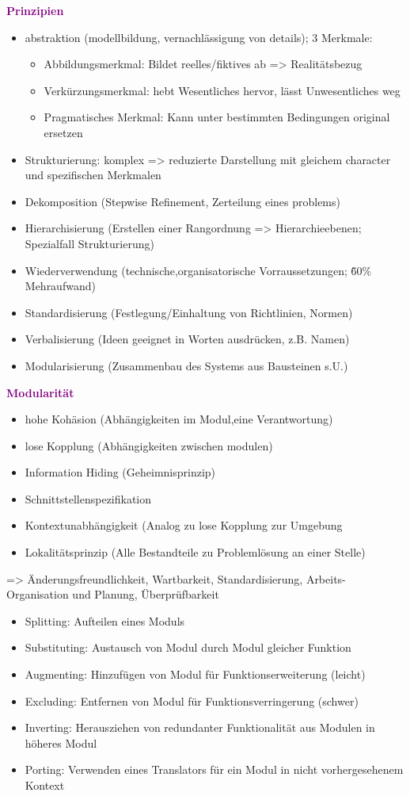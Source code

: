 \textbf{\textcolor{purple}{ Prinzipien}}~
\begin{itemize}
\item abstraktion (modellbildung, vernachlässigung von details); 3 Merkmale:
	\begin{itemize}
		 \item Abbildungsmerkmal: Bildet reelles/fiktives ab => Realitätsbezug
		 \item Verkürzungsmerkmal: hebt Wesentliches hervor, lässt Unwesentliches weg
		 \item Pragmatisches Merkmal: Kann unter bestimmten Bedingungen original ersetzen
	\end{itemize}
\item Strukturierung: komplex => reduzierte Darstellung mit gleichem character und spezifischen Merkmalen
\item Dekomposition (Stepwise Refinement, Zerteilung eines problems)
\item Hierarchisierung (Erstellen einer Rangordnung => Hierarchieebenen; Spezialfall Strukturierung)
\item Wiederverwendung (technische,organisatorische Vorraussetzungen; \~60\% Mehraufwand)
\item Standardisierung (Festlegung/Einhaltung von Richtlinien, Normen)
\item Verbalisierung (Ideen geeignet in Worten ausdrücken, z.B. Namen)
\item Modularisierung (Zusammenbau des Systems aus Bausteinen s.U.)
\end{itemize}
\textbf{\textcolor{purple}{Modularität}}
\begin{itemize}
\item hohe Kohäsion (Abhängigkeiten im Modul,eine Verantwortung)
\item lose Kopplung (Abhängigkeiten zwischen modulen)
\item Information Hiding (Geheimnisprinzip)
\item Schnittstellenspezifikation
\item Kontextunabhängigkeit (Analog zu lose Kopplung zur Umgebung
\item Lokalitätsprinzip (Alle Bestandteile zu Problemlösung an einer Stelle)
\end{itemize}
=> Änderungsfreundlichkeit, Wartbarkeit, Standardisierung, Arbeits- Organisation und Planung, Überprüfbarkeit

\begin{itemize}
\item Splitting: Aufteilen eines Moduls
\item Substituting: Austausch von Modul durch Modul gleicher Funktion
\item Augmenting: Hinzufügen von Modul für Funktionserweiterung (leicht)
\item Excluding: Entfernen von Modul für Funktionsverringerung (schwer)
\item Inverting: Herausziehen von redundanter Funktionalität aus Modulen in höheres Modul
\item Porting: Verwenden eines Translators für ein Modul in nicht vorhergesehenem Kontext
\end{itemize}

